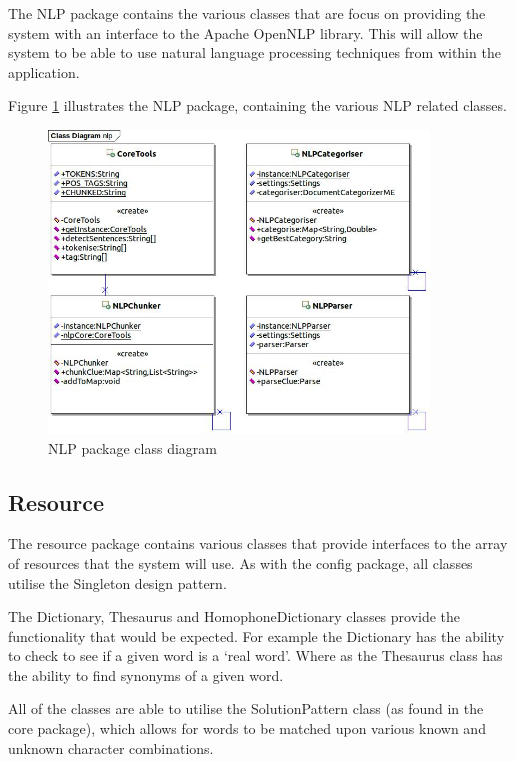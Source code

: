 The NLP package contains the various classes that are focus on providing the 
system with an interface to the Apache OpenNLP library. This will allow the 
system to be able to use natural language processing techniques from within the 
application.


Figure \ref{fig:nlp_package} illustrates the NLP package, containing the 
various NLP related classes.

\begin{figure}[H]
  \centering
  \includegraphics[width=0.9\textwidth]{design/class/nlp.jpg}
  \caption{NLP package class diagram}
  \label{fig:nlp_package}
\end{figure}


\subsection{Resource}
\label{sub:resource}

The resource package contains various classes that provide interfaces to the 
array of resources that the system will use. As with the config package, all 
classes utilise the Singleton design pattern.

The Dictionary, Thesaurus and HomophoneDictionary classes provide the 
functionality that would be expected. For example the Dictionary has the ability
to check to see if a given word is a `real word'. Where as the Thesaurus class
has the ability to find synonyms of a given word.

All of the classes are able to utilise the SolutionPattern class (as found in 
the core package), which allows for words to be matched upon various known and 
unknown character combinations.

